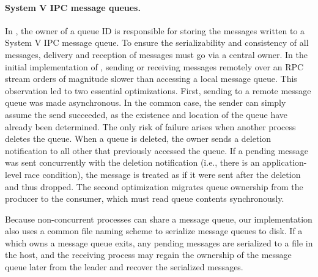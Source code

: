 \paragraph{System V IPC message queues.} In \graphene{}, the owner of a queue ID is responsible for 
storing the messages written to a System V IPC message queue.
To ensure the serializability and consistency of all messages,  delivery and reception of messages must go via a central owner.  
In the initial implementation of \thelibos{}, sending or receiving messages remotely over an RPC stream
orders of magnitude slower than accessing a local message queue.
This observation led to two essential optimizations.  
First, sending to a remote
message queue was made asynchronous.  In the common case, the sender can simply assume 
the send succeeded, as the existence and location of the queue have already been determined.
The only risk of failure arises when another process deletes the queue.
When a queue is deleted, the owner sends a deletion notification to all other \picoprocs{}
that previously accessed the queue.
If a pending message was sent concurrently with the deletion notification 
(i.e., there is an application-level race condition), 
the message is treated as if it were sent after the deletion and thus dropped.
The second optimization migrates queue ownership from the producer to the consumer,
which must read queue contents synchronously.


Because non-concurrent processes can share a message queue,
our implementation also uses a common file naming scheme to serialize message queues to disk.
If a \picoproc{} which owns a message queue exits, 
any pending messages are serialized to a file in the host,
and the receiving process may regain the ownership of the message queue later from the leader and recover the serialized messages.



